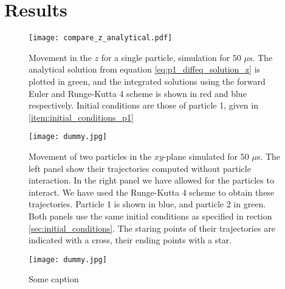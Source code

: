 \section{Results}\label{sec:results}



\begin{figure}[h!]
    \texttt{[image: compare\_z\_analytical.pdf]}
    \caption{Movement in the $z$ for a single particle, simulation for $50$ $\mu\mathrm{s}$. The analytical solution from equation \ref{eq:p1_diffeq_solution_z} is plotted in green, and the integrated solutions using the forward Euler and Runge-Kutta 4 scheme is shown in red and blue respectively. Initial conditions are those of particle 1, given in \ref{item:initial_conditions_p1} }
    \label{fig:compare_z_analytical}
\end{figure}




\newpage
\onecolumngrid


\begin{figure}[h!]
    \texttt{[image: dummy.jpg]}
    \caption{Movement of two particles in the $xy$-plane simulated for $50$ $\mu$s. The left panel show their trajectories computed without particle interaction. In the right panel we have allowed for the particles to interact. We have used the Runge-Kutta 4 scheme to obtain these trajectories. Particle 1 is shown in blue, and particle 2 in green. Both panels use the same initial conditions as specified in rection \ref{sec:initial_conditions}. The staring points of their trajectories are indicated with a cross, their ending points with a star. }
    \label{fig:xy_two_particles}
\end{figure}

\begin{figure}[h!]
    \texttt{[image: dummy.jpg]}
    \caption{Some caption}
    \label{fig:some_ref}
\end{figure}

